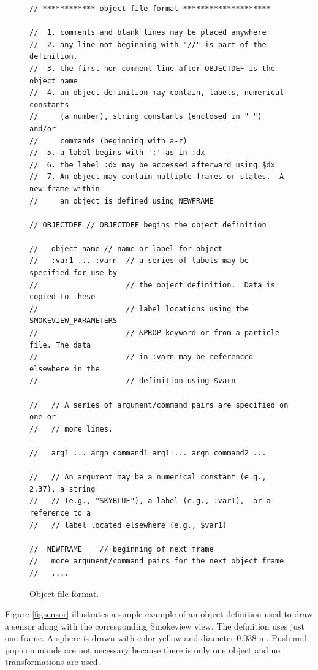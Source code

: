 \documentclass[11pt,twoside]{book}
\begin{document}
\begin{figure}[\figoptions]
{\small
\begin{lstlisting}[frame=single,rulecolor=\color{yellow},
framerule=1pt,framesep=1pc,fillcolor=\color{yellow}]
// ************ object file format ********************

//  1. comments and blank lines may be placed anywhere
//  2. any line not beginning with "//" is part of the definition.
//  3. the first non-comment line after OBJECTDEF is the object name
//  4. an object definition may contain, labels, numerical constants
//     (a number), string constants (enclosed in " ") and/or
//     commands (beginning with a-z)
//  5. a label begins with ':' as in :dx
//  6. the label :dx may be accessed afterward using $dx
//  7. An object may contain multiple frames or states.  A new frame within
//     an object is defined using NEWFRAME

// OBJECTDEF // OBJECTDEF begins the object definition

//   object_name // name or label for object
//   :var1 ... :varn  // a series of labels may be specified for use by
//                    // the object definition.  Data is copied to these
//                    // label locations using the SMOKEVIEW_PARAMETERS
//                    // &PROP keyword or from a particle file. The data
//                    // in :varn may be referenced  elsewhere in the
//                    // definition using $varn

//   // A series of argument/command pairs are specified on one or
//   // more lines.

//   arg1 ... argn command1 arg1 ... argn command2 ...

//   // An argument may be a numerical constant (e.g., 2.37), a string
//   // (e.g., "SKYBLUE"), a label (e.g., :var1),  or a reference to a
//   // label located elsewhere (e.g., $var1)

//  NEWFRAME    // beginning of next frame
//   more argument/command pairs for the next object frame
//   ....
\end{lstlisting}
}
\caption{Object file format.}
\label{figobjectdef}%
\end{figure}

Figure \ref{figsensor} illustrates a simple example of an object definition
used to draw a sensor along with the corresponding Smokeview view.
The definition uses just one frame. A sphere is drawn with color
yellow and diameter 0.038 m. Push and pop commands are not necessary
because there is only one object and no transformations are used.
\end{document}
